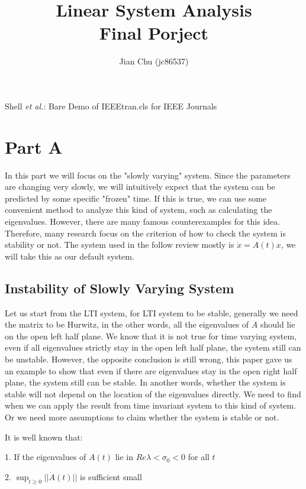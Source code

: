 \documentclass{article}
\begin{document}
\title{Linear System Analysis\\Final Porject}
\author{Jian Chu (jc86537)}
%
{Shell \MakeLowercase{\textit{et al.}}: Bare Demo of IEEEtran.cls for IEEE Journals}
\maketitle

\section{Part A}
In this part we will focus on the "slowly varying" system. Since the parameters are changing very slowly, we will intuitively expect that the system can be predicted by some specific "frozen" time. If this is true, we can use some convenient method to analyze this kind of system, such as calculating the eigenvalues. However, there are many famous counterexamples for this idea. Therefore, many research focus on the criterion of how to check the system is stability or not. The system used in the follow review mostly is $\dot{x} = A(t)x$, we will take this as our default system.

\subsection{Instability of Slowly Varying System \cite{skoog1972instability}}
Let us start from the LTI system, for LTI system to be stable, generally we need the matrix to be Hurwitz, in the other words, all the eigenvalues of $A$ should lie on the open left half plane. We know that it is not true for time varying system, even if all eigenvalues strictly stay in the open left half plane, the system still can be unstable. However, the opposite conclusion is still wrong, this paper gave us an example to show that even if there are eigenvalues stay in the open right half plane, the system still can be stable. In another words, whether the system is stable will not depend on the location of the eigenvalues directly. We need to find when we can apply the result from time invariant system to this kind of system. Or we need more assumptions to claim whether the system is stable or not. 

It is well known that: 

1. If the eigenvalues of $A(t)$ lie in $Re \lambda < \sigma_0 < 0$ for all $t$ 

2. $\sup_{t \ge 0} ||\dot{A}(t)||$ is sufficient small
\end{document}
